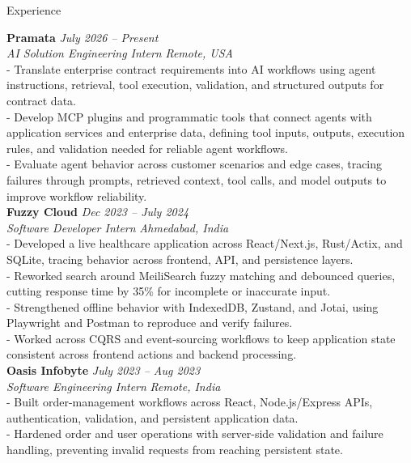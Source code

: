 \documentclass{resume}
\begin{document}
\begin{rSection}{Experience}

\textbf{Pramata} \hfill {\em July 2026 -- Present} \\
\textit{AI Solution Engineering Intern} \hfill {\em Remote, USA} \\
- Translate enterprise contract requirements into AI workflows using agent instructions, retrieval, tool execution, validation, and structured outputs for contract data. \\
- Develop MCP plugins and programmatic tools that connect agents with application services and enterprise data, defining tool inputs, outputs, execution rules, and validation needed for reliable agent workflows. \\
- Evaluate agent behavior across customer scenarios and edge cases, tracing failures through prompts, retrieved context, tool calls, and model outputs to improve workflow reliability.\\
\textbf{Fuzzy Cloud} \hfill {\em Dec 2023 -- July 2024} \\
\textit{Software Developer Intern} \hfill {\em Ahmedabad, India} \\
- Developed a live healthcare application across React/Next.js, Rust/Actix, and SQLite, tracing behavior across frontend, API, and persistence layers. \\
- Reworked search around MeiliSearch fuzzy matching and debounced queries, cutting response time by 35\% for incomplete or inaccurate input. \\
- Strengthened offline behavior with IndexedDB, Zustand, and Jotai, using Playwright and Postman to reproduce and verify failures. \\
- Worked across CQRS and event-sourcing workflows to keep application state consistent across frontend actions and backend processing.\\
\textbf{Oasis Infobyte} \hfill {\em July 2023 -- Aug 2023} \\
\textit{Software Engineering Intern} \hfill {\em Remote, India} \\
- Built order-management workflows across React, Node.js/Express APIs, authentication, validation, and persistent application data. \\
- Hardened order and user operations with server-side validation and failure handling, preventing invalid requests from reaching persistent state.
\end{rSection}

\end{document}
